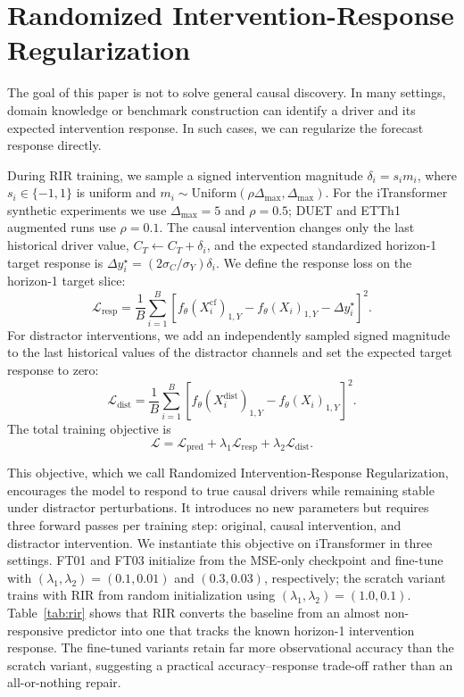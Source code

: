\documentclass{article}
\newcommand{\rir}{Randomized Intervention-Response Regularization}
\begin{document}
\section{\rir{}}

The goal of this paper is not to solve general causal discovery. In many settings,
domain knowledge or benchmark construction can identify a driver and its expected
intervention response. In such cases, we can regularize the forecast response directly.

During RIR training, we sample a signed intervention magnitude
$\delta_i=s_i m_i$, where $s_i\in\{-1,1\}$ is uniform and
$m_i\sim\mathrm{Uniform}(\rho\Delta_{\max},\Delta_{\max})$. For the iTransformer
synthetic experiments we use $\Delta_{\max}=5$ and $\rho=0.5$; DUET and ETTh1
augmented runs use $\rho=0.1$. The causal intervention changes only the last
historical driver value, $C_T\leftarrow C_T+\delta_i$, and the expected standardized
horizon-1 target response is $\Delta y_i^\star=(2\sigma_C/\sigma_Y)\delta_i$.
We define the response loss on the horizon-1 target slice:
\begin{equation}
\mathcal{L}_{\mathrm{resp}}
=
\frac{1}{B}\sum_{i=1}^{B}
\left[
f_\theta(X_i^{\mathrm{cf}})_{1,Y}
-
f_\theta(X_i)_{1,Y}
-
\Delta y_i^\star
\right]^2.
\end{equation}
For distractor interventions, we add an independently sampled signed magnitude to
the last historical values of the distractor channels and set the expected target
response to zero:
\begin{equation}
\mathcal{L}_{\mathrm{dist}}
=
\frac{1}{B}\sum_{i=1}^{B}
\left[
f_\theta(X_i^{\mathrm{dist}})_{1,Y}
-
f_\theta(X_i)_{1,Y}
\right]^2.
\end{equation}
The total training objective is
\begin{equation}
\mathcal{L}
=
\mathcal{L}_{\mathrm{pred}}
+
\lambda_1 \mathcal{L}_{\mathrm{resp}}
+
\lambda_2 \mathcal{L}_{\mathrm{dist}}.
\label{eq:rir}
\end{equation}

This objective, which we call \rir{}, encourages the model to respond to true causal
drivers while remaining stable under distractor perturbations. It introduces no new
parameters but requires three forward passes per training step: original, causal
intervention, and distractor intervention. We instantiate this objective on
iTransformer in three settings. FT01 and FT03 initialize
from the MSE-only checkpoint and fine-tune with
$(\lambda_1,\lambda_2)=(0.1,0.01)$ and $(0.3,0.03)$, respectively; the scratch
variant trains with RIR from random initialization using
$(\lambda_1,\lambda_2)=(1.0,0.1)$. Table~\ref{tab:rir} shows that
RIR converts the baseline from an almost non-responsive predictor into one that
tracks the known horizon-1 intervention response. The fine-tuned variants retain far
more observational accuracy than the scratch variant, suggesting a practical
accuracy--response trade-off rather than an all-or-nothing repair.
\end{document}
